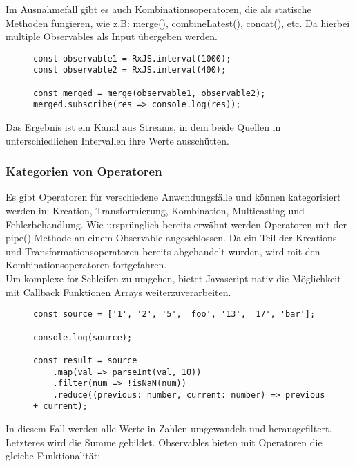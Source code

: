 \noindent
Im Ausnahmefall gibt es auch Kombinationsoperatoren, die als statische Methoden fungieren, wie z.B: merge(), combineLatest(), concat(), etc. Da hierbei multiple Observables als Input übergeben werden.

\begin{figure}[H]
\begin{lstlisting}[basicstyle=\small]
const observable1 = RxJS.interval(1000);
const observable2 = RxJS.interval(400);

const merged = merge(observable1, observable2);
merged.subscribe(res => console.log(res));
\end{lstlisting}
\end{figure}

\noindent
Das Ergebnis ist ein Kanal aus Streams, in dem beide Quellen in unterschiedlichen Intervallen ihre Werte ausschütten.

\subsubsection{Kategorien von Operatoren}

Es gibt Operatoren für verschiedene Anwendungsfälle und können kategorisiert werden in: Kreation, Transformierung, Kombination, Multicasting und Fehlerbehandlung. Wie ursprünglich bereits erwähnt werden Operatoren mit der pipe() Methode an einem Observable angeschlossen. Da ein Teil der Kreations- und Transformationsoperatoren bereits abgehandelt wurden, wird mit den Kombinationsoperatoren fortgefahren.\\

\noindent
Um komplexe for Schleifen zu umgehen, bietet Javascript nativ die Möglichkeit mit Callback Funktionen Arrays weiterzuverarbeiten.

\begin{figure}[H]
\begin{lstlisting}[basicstyle=\small]
const source = ['1', '2', '5', 'foo', '13', '17', 'bar'];

console.log(source);

const result = source
    .map(val => parseInt(val, 10))
    .filter(num => !isNaN(num))
    .reduce((previous: number, current: number) => previous + current);
\end{lstlisting}
\end{figure}

\noindent
In diesem Fall werden alle Werte in Zahlen umgewandelt und herausgefiltert. Letzteres wird die Summe gebildet. Observables bieten mit Operatoren die gleiche Funktionalität:

